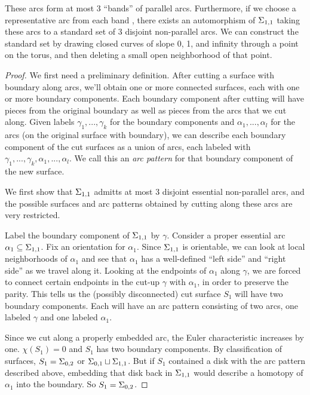 \begin{lemma}\label{L:ex1.1}

These arcs form at most 3 ``bands'' of parallel arcs. Furthermore, if we choose
a representative arc from each band , there exists an automorphism of
$\Sigma_{1,1}$ taking these arcs to a standard set of 3 disjoint non-parallel
arcs. We can construct the standard set by drawing closed curves of slope 0, 1,
and infinity through a point on the torus, and then deleting a small open
neighborhood of that point.

\end{lemma}
\begin{proof}

We first need a preliminary definition. After cutting a surface with boundary
along arcs, we'll obtain one or more connected surfaces, each with one or more
boundary components. Each boundary component after cutting will have pieces
from the original boundary as well as pieces from the arcs that we cut along.
Given labels $\gamma_1,...,\gamma_k$ for the boundary components and
$\alpha_1,...,\alpha_l$ for the arcs (on the original surface with boundary),
we can describe each boundary component of the cut surfaces as a union of arcs,
each labeled with $\gamma_1,...,\gamma_k,\alpha_1,...,\alpha_l$. We call this
an \emph{arc pattern} for that boundary component of the new surface.

We first show that $\Sigma_{1,1}$ admitts at most 3 disjoint essential
non-parallel arcs, and the possible surfaces and arc patterns obtained by
cutting along these arcs are very restricted.

Label the boundary component of $\Sigma_{1,1}$ by $\gamma$. Consider a proper
essential arc $\alpha_1 \subseteq \Sigma_{1,1}$. Fix an orientation for $\alpha_1$.
Since $\Sigma_{1,1}$ is orientable, we can look at local neighborhoods of
$\alpha_1$ and see that $\alpha_1$ has a well-defined ``left side'' and ``right
side'' as we travel along it. Looking at the endpoints of $\alpha_1$ along
$\gamma$, we are forced to connect certain endpoints in the cut-up $\gamma$
with $\alpha_1$, in order to preserve the parity. This tells us the (possibly
disconnected) cut surface $S_1$ will have two boundary components. Each will
have an arc pattern consisting of two arcs, one labeled $\gamma$ and one
labeled $\alpha_1$.

Since we cut along a properly embedded arc, the Euler characteristic increases
by one. $\chi(S_1)=0$ and $S_1$ has two boundary components. By classification
of surfaces, $S_1 = \Sigma_{0,2}$ or $\Sigma_{0,1} \sqcup \Sigma_{1,1}$. But if $S_1$
contained a disk with the arc pattern described above, embedding that disk back
in $\Sigma_{1,1}$ would describe a homotopy of $\alpha_1$ into the boundary. So
$S_1 = \Sigma_{0,2}$.


\end{proof}
